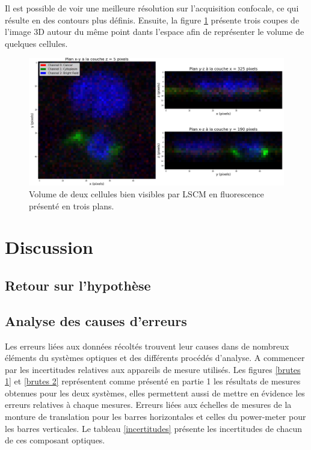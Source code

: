 \documentclass[11pt,letterpaper]{article}
\begin{document}
Il est possible de voir une meilleure résolution sur l'acquisition confocale, ce qui résulte en des contours plus définis.
Ensuite, la figure \ref{3d_cells} présente trois coupes de l'image 3D autour du même point dants l'espace afin de
représenter le volume de quelques cellules.

\begin{figure}[H]
  \centering
  \includegraphics[scale=0.34]{volume.png}
  \caption{Volume de deux cellules bien visibles par LSCM en fluorescence présenté en trois plans.}
  \label{3d_cells}
\end{figure}


\section{Discussion}

\subsection{Retour sur l'hypothèse}


\subsection{Analyse des causes d'erreurs}

Les erreurs liées aux données récoltés trouvent leur causes dans de nombreux éléments du systèmes optiques et des différents procédés d'analyse. A commencer par les incertitudes relatives aux appareils de mesure utilisés. Les figures \ref{brutes 1} et \ref{brutes 2} représentent comme présenté en partie 1 les résultats de mesures obtenues pour les deux systèmes, elles permettent aussi de mettre en évidence les erreurs relatives à chaque mesures. Erreurs liées aux échelles de mesures de la monture de translation pour les barres horizontales et celles du power-meter pour les barres verticales. Le tableau \ref{incertitudes} présente les incertitudes de chacun de ces composant optiques. 
\end{document}
